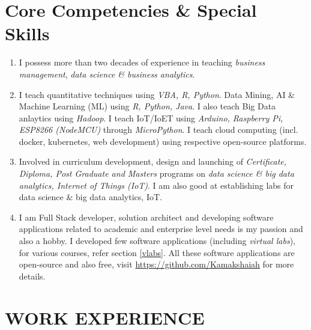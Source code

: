 \documentclass[10pt]{article}
\begin{document}
\section{Core Competencies \& Special Skills} \hline \vspace{0.5cm}

\begin{enumerate}
	\item I possess more than two decades of experience in teaching \emph{business management}, \emph{data science \& business analytics}.
	\item I teach quantitative techniques using \emph{VBA, R, Python}. Data Mining, AI \& Machine Learning (ML) using \emph{R, Python, Java}. I also teach Big Data anlaytics using \emph{Hadoop}. I teach IoT/IoET using \emph{Arduino, Raspberry Pi, ESP8266 (NodeMCU)} through \emph{MicroPython}. I teach cloud computing (incl. docker, kubernetes, web development) using respective open-source platforms. 
	\item Involved in curriculum development, design and launching of \emph{Certificate, Diploma, Post Graduate and Masters} programs on \emph{data science \& big data analytics, Internet of Things (IoT)}. I am also good at establishing labs for data science \& big data analytics, IoT.
	
	\item I am {Full Stack} developer, solution architect and developing software applications related to academic and enterprise level needs is my passion and also a hobby. I developed few software applications (including \textit{virtual labs}), for various courses, refer section \ref{vlabs}. All these software applications are open-source and also free, visit \url{https://github.com/Kamakshaiah} for more details. 
	

\end{enumerate}
	
\newpage
\section{WORK EXPERIENCE} \hline \vspace{0.5cm}

\end{document}

